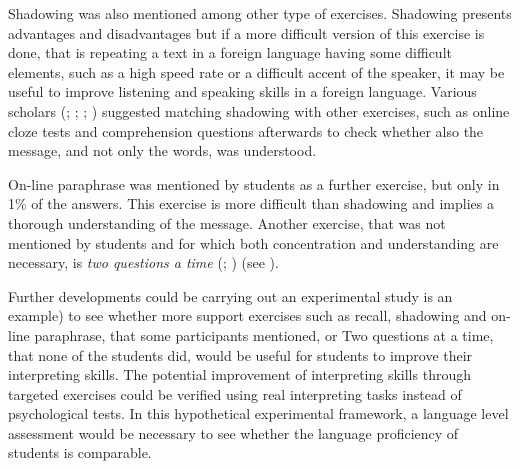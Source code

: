 \documentclass[output=paper]{../langscibook}
\begin{document}
Shadowing was also mentioned among other type of exercises. Shadowing presents advantages and disadvantages \citep{Kurz1992} but if a more difficult version of this exercise is done, that is repeating a text in a foreign language having some difficult elements, such as a high speed rate or a difficult accent of the speaker, it may be useful to improve listening and speaking skills in a foreign language. Various scholars (\citealt{Kalina1992};  \citealt{PadillaBenitez2002}; \citealt{Gillies2013}; \citealt{SettonDawrant2016b}) suggested matching shadowing with other exercises, such as online cloze tests and comprehension questions afterwards to check whether also the message, and not only the words, was understood.

On-line paraphrase was mentioned by students as a further exercise, but only in 1\% of the answers. This exercise is more difficult than shadowing and implies a thorough understanding of the message. Another exercise, that was not mentioned by students and for which both concentration and understanding are necessary, is \emph{two questions a time} (\citealt{Kalina1992}; \citealt{Gillies2013}) (see ).

Further developments could be carrying out an experimental study \citealt{YenkimalekivanHeuven2017} is an example) to see whether more support exercises such as recall, shadowing and on-line paraphrase, that some participants mentioned, or Two questions at a time, that none of the students did, would be useful for students to improve their interpreting skills. The potential improvement of interpreting skills through targeted exercises could be verified using real interpreting tasks instead of psychological tests. In this hypothetical experimental framework, a language level assessment would be necessary to see whether the language proficiency of students is comparable.

\sloppy\printbibliography[heading=subbibliography,notkeyword=this]
\end{document}
